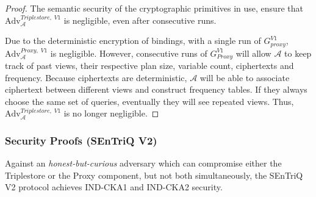 \begin{proof}
    The semantic security of the cryptographic primitives in use, ensure that \linebreak $\mathrm{Adv}_{\mathcal{A}}^{Triplestore, \; V1}$ is negligible, even after consecutive runs. 
    
    Due to the deterministic encryption of bindings, with a single run of $G^{V1}_{proxy}$, \linebreak $\mathrm{Adv}_{\mathcal{A}}^{Proxy, \; V1}$ is negligible. However, consecutive runs of $G^{V1}_{Proxy}$ will allow $\mathcal{A}$ to keep track of past views, their respective plan size, variable count, ciphertexts and frequency. Because ciphertexts are deterministic, $\mathcal{A}$ will be able to associate ciphertext between different views and construct frequency tables. If they always choose the same set of queries, eventually they will see repeated views. Thus, $\mathrm{Adv}_{\mathcal{A}}^{Triplestore, \; V1}$ is no longer negligible.
\end{proof}

\subsubsection{Security Proofs (SEnTriQ V2)}

\begin{theorem} 
    Against an \emph{honest-but-curious} adversary which can compromise either the Triplestore or the Proxy component, but not both simultaneously, the \gls{SEnTriQ} V2 protocol achieves \gls{IND-CKA1} and \gls{IND-CKA2} security.
\end{theorem}

